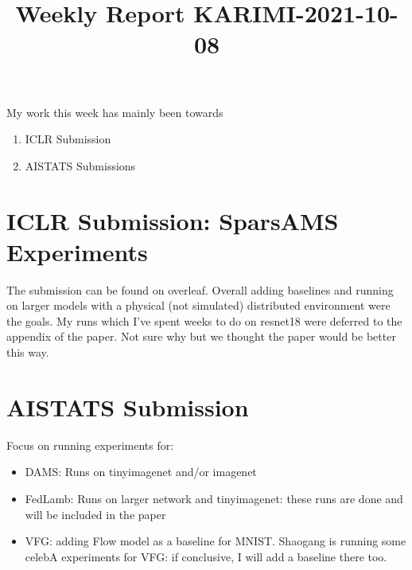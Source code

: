 \documentclass{article}
\begin{document}
\title{Weekly Report KARIMI-2021-10-08}


\date{}
\maketitle

\vspace{-0.5in}


My work this week has mainly been towards
\begin{enumerate}
\item ICLR Submission
\item AISTATS Submissions
\end{enumerate}


\section{ICLR Submission: SparsAMS Experiments}
The submission can be found on overleaf.
Overall adding baselines and running on larger models with a physical (not simulated) distributed environment were the goals.
My runs which I've spent weeks to do on resnet18 were deferred to the appendix of the paper. Not sure why but we thought the paper would be better this way.

\section{AISTATS Submission}
Focus on running experiments for:
\begin{itemize}
\item DAMS: Runs on tinyimagenet and/or imagenet
\item FedLamb: Runs on larger network and tinyimagenet: these runs are done and will be included in the paper
\item VFG: adding Flow model as a baseline for MNIST. Shaogang is running some celebA experiments for VFG: if conclusive, I will add a baseline there too.
\end{itemize}



\end{document}
